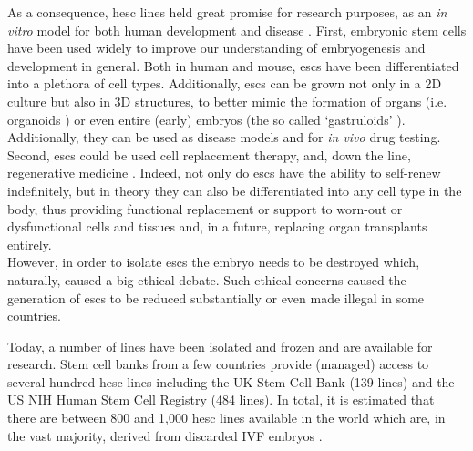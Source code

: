 As a consequence, \gls{hesc} lines held great promise for research purposes, as an \textit{in vitro} model for both human development and disease \cite{saha2009technical}.
First, embryonic stem cells have been used widely to improve our understanding of embryogenesis and development in general. 
Both in human and mouse, \glspl{esc} have been differentiated into a plethora of cell types.
Additionally, \glspl{esc} can be grown not only in a 2D culture but also in 3D structures, to better mimic the formation of organs (i.e. organoids \cite{clevers2016modeling, lancaster2013cerebral}) or even entire (early) embryos (the so called `gastruloids' \cite{van2020single2}). 
Additionally, they can be used as disease models and for \textit{in vivo} drug testing.\\

Second, \glspl{esc} could be used cell replacement therapy, and, down the line, regenerative medicine \cite{kimbrel2015current}.
Indeed, not only do \glspl{esc} have the ability to self-renew indefinitely, but in theory they can also be differentiated into any cell type in the body, thus providing functional replacement or support to worn-out or dysfunctional cells and tissues and, in a future, replacing organ transplants entirely. 
\\

However, in order to isolate \glspl{esc} the embryo needs to be destroyed which, naturally, caused a big ethical debate.
Such ethical concerns caused the generation of \glspl{esc} to be reduced substantially or even made illegal in some countries.

Today, a number of lines have been isolated and frozen and are available for research.
Stem cell banks from a few countries provide (managed) access to several hundred \gls{hesc} lines including the UK Stem Cell Bank (139 lines) and the US NIH Human Stem Cell Registry (484 lines).
In total, it is estimated that there are between 800 and 1,000 \gls{hesc} lines available in the world which are, in the vast majority, derived from discarded IVF embryos \cite{isasi2009governing}.\\

